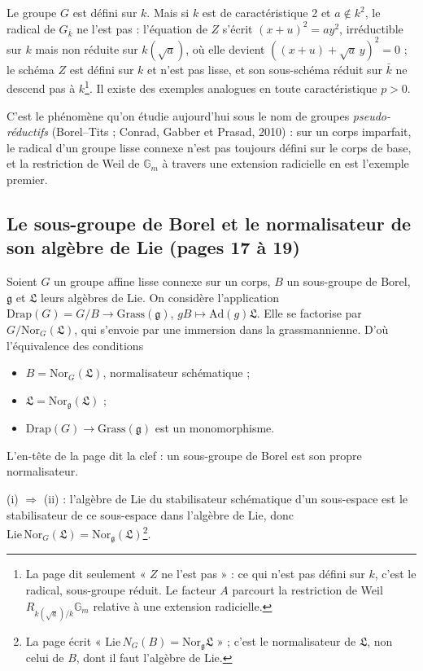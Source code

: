\documentclass[11pt,a4paper]{article}
\begin{document}
Le groupe $G$ est défini sur $k$. Mais si $k$ est de caractéristique 2 et
$a \notin k^2$, le radical de $G_{\bar k}$ ne l'est pas : l'équation de $Z$
s'écrit $(x+u)^2 = ay^2$, irréductible sur $k$ mais non réduite sur
$k(\sqrt a)$, où elle devient $((x+u) + \sqrt a\, y)^2 = 0$ ; le schéma $Z$ est
défini sur $k$ et n'est pas lisse, et son sous-schéma réduit sur $\bar k$ ne
descend pas à $k$\footnote{La page dit seulement « $Z$ ne l'est pas » : ce qui
n'est pas défini sur $k$, c'est le radical, sous-groupe réduit. Le facteur $A$
parcourt la restriction de Weil $R_{k(\sqrt a)/k}\mathbb{G}_m$ relative à une
extension radicielle.}. Il existe des exemples analogues en toute
caractéristique $p > 0$.

C'est le phénomène qu'on étudie aujourd'hui sous le nom de groupes
\emph{pseudo-réductifs} (Borel--Tits ; Conrad, Gabber et Prasad, 2010) : sur un
corps imparfait, le radical d'un groupe lisse connexe n'est pas toujours défini
sur le corps de base, et la restriction de Weil de $\mathbb{G}_m$ à travers une
extension radicielle en est l'exemple premier.

\subsection*{Le sous-groupe de Borel et le normalisateur de son algèbre de Lie (pages 17 à 19)}

Soient $G$ un groupe affine lisse connexe sur un corps, $B$ un sous-groupe de
Borel, $\mathfrak{g}$ et $\mathfrak{L}$ leurs algèbres de Lie. On considère
l'application $\mathrm{Drap}(G) = G/B \to \mathrm{Grass}(\mathfrak{g})$,
$gB \mapsto \mathrm{Ad}(g)\mathfrak{L}$. Elle se factorise par
$G/\mathrm{Nor}_G(\mathfrak{L})$, qui s'envoie par une immersion dans la
grassmannienne. D'où l'équivalence des conditions
\begin{itemize}
\item[(i)] $B = \mathrm{Nor}_G(\mathfrak{L})$, normalisateur schématique ;
\item[(ii)] $\mathfrak{L} = \mathrm{Nor}_{\mathfrak{g}}(\mathfrak{L})$ ;
\item[(iii)] $\mathrm{Drap}(G) \to \mathrm{Grass}(\mathfrak{g})$ est un
monomorphisme.
\end{itemize}
L'en-tête de la page dit la clef : un sous-groupe de Borel est son propre
normalisateur.

(i) $\Rightarrow$ (ii) : l'algèbre de Lie du stabilisateur schématique d'un
sous-espace est le stabilisateur de ce sous-espace dans l'algèbre de Lie, donc
$\mathrm{Lie}\,\mathrm{Nor}_G(\mathfrak{L}) =
\mathrm{Nor}_{\mathfrak{g}}(\mathfrak{L})$\footnote{La page écrit
« $\mathrm{Lie}\,N_G(B) = \mathrm{Nor}_{\mathfrak{g}}\mathfrak{L}$ » ; c'est le
normalisateur de $\mathfrak{L}$, non celui de $B$, dont il faut l'algèbre de
Lie.}.
\end{document}
